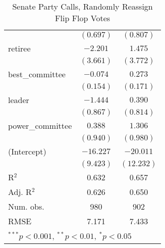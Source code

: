 \documentclass[12pt]{article}
\begin{document}
\begin{table}
\begin{center}
\begin{tabular}{l c c }
			& $(0.697)$      & $(0.807)$      \\
			retiree                       & $-2.201$       & $1.475$        \\
			& $(3.661)$      & $(3.772)$      \\
			best\_committee               & $-0.074$       & $0.273$        \\
			& $(0.154)$      & $(0.171)$      \\
			leader                        & $-1.444$       & $0.390$        \\
			& $(0.867)$      & $(0.814)$      \\
			power\_committee              & $0.388$        & $1.306$        \\
			& $(0.940)$      & $(0.980)$      \\
			(Intercept)                   & $-16.227$      & $-20.011$      \\
			& $(9.423)$      & $(12.232)$     \\
			\hline
			R$^2$                         & 0.632          & 0.657          \\
			Adj. R$^2$                    & 0.626          & 0.650          \\
			Num. obs.                     & 980            & 902            \\
			RMSE                          & 7.171          & 7.433          \\
			\hline
			\multicolumn{3}{l}{\scriptsize{$^{***}p<0.001$, $^{**}p<0.01$, $^*p<0.05$}}
		\end{tabular}
		\caption{Senate Party Calls, Randomly Reassign Flip Flop Votes}
	\end{center}
\end{table}
\end{document}
